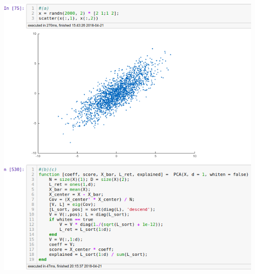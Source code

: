 \documentclass[12pt,letterpaper,fleqn]{hmcpset}
\begin{document}
\begin{problem}[05-PCA.3]
\end{problem}
\begin{solution}
\includegraphics[width=1\textwidth]{2.jpg}\\

\end{solution}
\end{document}
